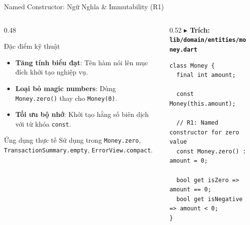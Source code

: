 \documentclass[aspectratio=169, 10pt]{beamer}
\newcommand{\speakerA}{\hfill\tcbox[colback=IndigoAccent,colframe=IndigoAccent,boxsep=1pt,left=3pt,right=3pt,top=1pt,bottom=1pt]{\tiny\bfseries\color{white}SV A: Nguyễn Đức Hải}}
\begin{document}
\begin{frame}[fragile]{Named Constructor: Ngữ Nghĩa \& Immutability (R1) \speakerA}
  \begin{columns}[c]
    \begin{column}{0.48\textwidth}
      \begin{infobox}[IndigoAccent]{Đặc điểm kỹ thuật}
        \begin{itemize}\setlength{\itemsep}{4pt}\scriptsize
          \item \textbf{Tăng tính biểu đạt}: Tên hàm nói lên mục đích khởi tạo nghiệp vụ.
          \item \textbf{Loại bỏ magic numbers}: Dùng \texttt{Money.zero()} thay cho \texttt{Money(0)}.
          \item \textbf{Tối ưu bộ nhớ}: Khởi tạo hằng số biên dịch với từ khóa \texttt{const}.
        \end{itemize}
      \end{infobox}
      \vspace{2mm}
      \begin{infobox}[NavyPrimary]{Ứng dụng thực tế}
        \scriptsize Sử dụng trong \texttt{Money.zero}, \texttt{TransactionSummary.empty}, \texttt{ErrorView.compact}.
      \end{infobox}
    \end{column}

    \begin{column}{0.52\textwidth}
\vspace{1mm}
{\scriptsize\bfseries\color{NavyPrimary} $\blacktriangleright$ Trích: \texttt{lib/domain/entities/money.dart}}\\[1mm]
\begin{lstlisting}
class Money {
  final int amount;

  const Money(this.amount);

  // R1: Named constructor for zero value
  const Money.zero() : amount = 0;

  bool get isZero => amount == 0;
  bool get isNegative => amount < 0;
}
\end{lstlisting}
    \end{column}
  \end{columns}
\end{frame}
\end{document}
